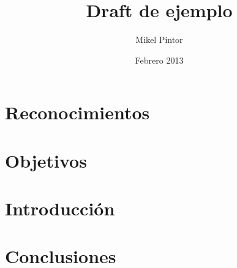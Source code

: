 \documentclass[oneside]{scrbook}
\title{Draft de ejemplo}
\author{Mikel Pintor}
\date{Febrero 2013}
\begin{document}
\maketitle

\frontmatter
\tableofcontents
\listoffigures
\listoftables

\chapter{Reconocimientos}
\chapter{Objetivos}

\mainmatter

\chapter{Introducción}
\label{cha:introduccion}


\chapter{Conclusiones}
\label{cha:conclusiones}

\backmatter

\end{document}
